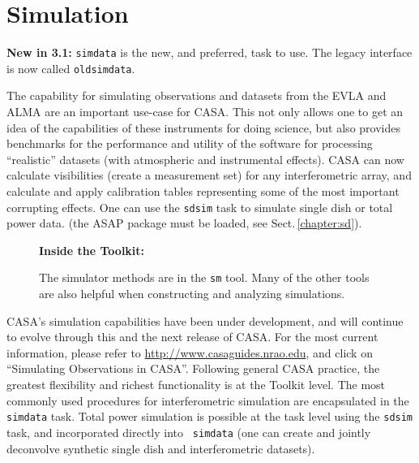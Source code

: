 
\chapter[Appendix: Simulation]{Simulation}
\label{chapter:sim}

{\bfseries New in 3.1:} {\tt simdata} is the new, and preferred,
task to use.  The legacy interface is now called {\tt oldsimdata}.

The capability for simulating observations and datasets from the EVLA
and ALMA are an important use-case for CASA.  This not only allows one
to get an idea of the capabilities of these instruments for doing
science, but also provides benchmarks for the performance and utility
of the software for processing ``realistic'' datasets (with
atmospheric and instrumental effects).  CASA can now calculate
visibilities (create a measurement set) for any interferometric array,
and calculate and apply calibration tables representing some of the
most important corrupting effects.  One can use the {\tt sdsim} task
to simulate single dish or total power data.  (the ASAP package must
be loaded, see Sect.\,\ref{chapter:sd}).

\begin{wrapfigure}{r}{2.5in}
 \begin{boxedminipage}{2.5in}
    \centerline{\bf Inside the Toolkit:}
    The simulator methods are in the {\tt sm} tool.
    Many of the other tools are also helpful when
    constructing and analyzing simulations.
 \end{boxedminipage}
\end{wrapfigure}

CASA's simulation capabilities have been under development, and will
continue to evolve through this and the next release of CASA.
For the most current information, please refer to
\url{http://www.casaguides.nrao.edu}, and click on ``Simulating
Observations in CASA''.
%
Following general CASA practice, the greatest flexibility and richest
functionality is at the Toolkit level.  The most commonly used
procedures for interferometric simulation are encapsulated in the {\tt
simdata} task.  Total power simulation is possible at the task level
using the {\tt sdsim} task, and incorporated directly into {\tt
simdata} (one can create and jointly deconvolve synthetic single dish
and interferometric datasets).

